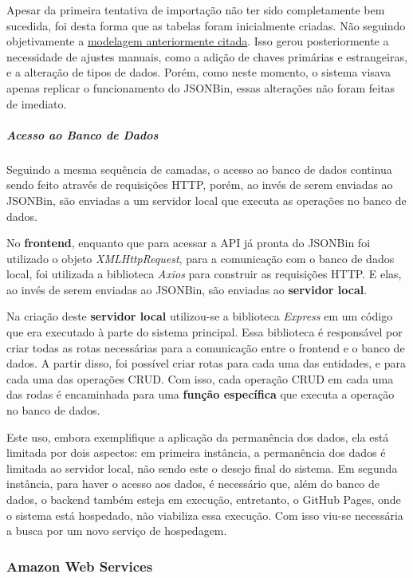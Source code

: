Apesar da primeira tentativa de importação não ter sido completamente bem sucedida, foi desta forma que as tabelas foram inicialmente criadas. Não seguindo objetivamente a \hyperref[ModelagemBD]{modelagem anteriormente citada}. Isso gerou posteriormente a necessidade de ajustes manuais, como a adição de chaves primárias e estrangeiras, e a alteração de tipos de dados. Porém, como neste momento, o sistema visava apenas replicar o funcionamento do JSONBin, essas alterações não foram feitas de imediato.

\subparagraph*{Acesso ao Banco de Dados}

Seguindo a mesma sequência de camadas, o acesso ao banco de dados continua sendo feito através de requisições HTTP, porém, ao invés de serem enviadas ao JSONBin, são enviadas a um servidor local que executa as operações no banco de dados.

No \textbf{frontend}, enquanto que para acessar a API já pronta do JSONBin foi utilizado o objeto \textit{XMLHttpRequest}, para a comunicação com o banco de dados local, foi utilizada a biblioteca \textit{Axios} para construir as requisições HTTP. E elas, ao invés de serem enviadas ao JSONBin, são enviadas ao \textbf{servidor local}.

Na criação deste \textbf{servidor local} utilizou-se a biblioteca \textit{Express} em um código que era executado à parte do sistema principal. Essa biblioteca é responsável por criar todas as rotas necessárias para a comunicação entre o frontend e o banco de dados. A partir disso, foi possível criar rotas para cada uma das entidades, e para cada uma das operações CRUD. Com isso, cada operação CRUD em cada uma das rodas é encaminhada para uma \textbf{função específica} que executa a operação no banco de dados.

Este uso, embora exemplifique a aplicação da permanência dos dados, ela está limitada por dois aspectos: em primeira instância, a permanência dos dados é limitada ao servidor local, não sendo este o desejo final do sistema. Em segunda instância, para haver o acesso aos dados, é necessário que, além do banco de dados, o backend também esteja em execução, entretanto, o GitHub Pages, onde o sistema está hospedado, não viabiliza essa execução. Com isso viu-se necessária a busca por um novo serviço de hospedagem.

\subsubsection{Amazon Web Services}

